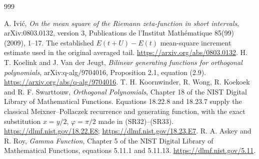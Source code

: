 \documentclass[11pt,a4paper]{article}
\begin{document}
\endgroup

\endgroup

\clearpage
\begin{thebibliography}{999}

 A. Ivi\'c, \emph{On the mean square of the Riemann zeta-function
in short intervals}, arXiv:0803.0132, version 3, Publications de l'Institut
Math\'ematique 85(99) (2009), 1--17. The established $E(t+U)-E(t)$
mean-square increment estimate used in the original averaged tail.
\url{https://arxiv.org/abs/0803.0132}.
 H. T. Koelink and J. Van der Jeugt,
\emph{Bilinear generating functions for orthogonal polynomials},
arXiv:q-alg/9704016, Proposition 2.1, equation (2.9).
\url{https://arxiv.org/abs/q-alg/9704016}.
 T. H. Koornwinder, R. Wong, R. Koekoek and R. F. Swarttouw,
\emph{Orthogonal Polynomials}, Chapter 18 of the NIST Digital Library of
Mathematical Functions. Equations 18.22.8 and 18.23.7 supply the classical
Meixner--Pollaczek recurrence and generating function, with the exact
substitution $x=y/2$, $\varphi=\pi/2$ made in (SR32)--(SR33).
\url{https://dlmf.nist.gov/18.22.E8};
\url{https://dlmf.nist.gov/18.23.E7}.
 R. A. Askey and R. Roy, \emph{Gamma Function}, Chapter 5
of the NIST Digital Library of Mathematical Functions, equations 5.11.1 and
5.11.13. \url{https://dlmf.nist.gov/5.11}.


\end{thebibliography}
\end{document}
